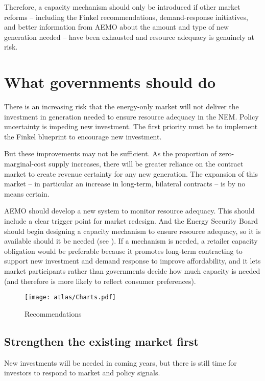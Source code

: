 \documentclass[FrontPage]{grattan}
\begin{document}
Therefore, a capacity mechanism should only be introduced if other market reforms -- including the Finkel recommendations, demand-response initiatives, and better information from AEMO about the amount and type of new generation needed -- have been exhausted and resource adequacy is genuinely at risk.


\chapter{What governments should do}\label{chap:what-governments-should-do}
There is an increasing risk that the energy-only market will not deliver the investment in generation needed to ensure resource adequacy in the NEM\@. Policy uncertainty is impeding new investment. The first priority must be to implement the Finkel blueprint to encourage new investment.

But these improvements may not be sufficient. As the proportion of zero-marginal-cost supply increases, there will be greater reliance on the contract market to create revenue certainty for any new generation. The expansion of this market -- in particular an increase in long-term, bilateral contracts -- is by no means certain.

AEMO should develop a new system to monitor resource adequacy. This should include a clear trigger point for market redesign. And the Energy Security Board should begin designing a capacity mechanism to ensure resource adequacy, so it is available should it be needed (see ). If a mechanism is needed, a retailer capacity obligation would be preferable because it promotes long-term contracting to support new investment and demand response to improve affordability, and it lets market participants rather than governments decide how much capacity is needed (and therefore is more likely to reflect consumer preferences).

\begin{figure}
\caption{Recommendations}\label{fig:flow-chart-of-recs}
\texttt{[image: atlas/Charts.pdf]}
\end{figure}

\section{Strengthen the existing market first}\label{sec:strengthen-the-existing-market-first}
New investments will be needed in coming years, but there is still time for investors to respond to market and policy signals.
\end{document}
